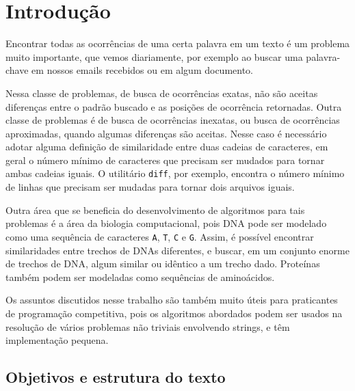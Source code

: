 \documentclass[11pt,oneside,a4paper, openany]{book}
\renewcommand{\chaptermark}[1]{\markboth{\MakeUppercase{#1}}{}}
\begin{document}
\mainmatter


\onehalfspacing            %

\setcounter{secnumdepth}{0}


\chapter*{Introdução}
\chaptermark{Introdução}


Encontrar todas as ocorrências de uma certa palavra em um texto é um problema muito importante, que vemos diariamente, por exemplo ao buscar uma palavra-chave em nossos emails recebidos ou em algum documento.

Nessa classe de problemas, de busca de ocorrências exatas, não são aceitas diferenças entre o padrão buscado e as posições de ocorrência retornadas. Outra classe de problemas é de busca de ocorrências inexatas, ou busca de ocorrências aproximadas, quando algumas diferenças são aceitas. Nesse caso é necessário adotar alguma definição de similaridade entre duas cadeias de caracteres, em geral o número mínimo de caracteres que precisam ser mudados para tornar ambas cadeias iguais. O utilitário \texttt{diff}, por exemplo, encontra o número mínimo de linhas que precisam ser mudadas para tornar dois arquivos iguais.

Outra área que se beneficia do desenvolvimento de algoritmos para tais problemas é a área da biologia computacional, pois DNA pode ser modelado como uma sequência de caracteres \texttt{A}, \texttt{T}, \texttt{C} e \texttt{G}. Assim, é possível encontrar similaridades entre trechos de DNAs diferentes, e buscar, em um conjunto enorme de trechos de DNA, algum similar ou idêntico a um trecho dado. Proteínas também podem ser modeladas como sequências de aminoácidos.

Os assuntos discutidos nesse trabalho são também muito úteis para praticantes de programação competitiva, pois os algoritmos abordados podem ser usados na resolução de vários problemas não triviais envolvendo strings, e têm implementação pequena.

\section{Objetivos e estrutura do texto}
\end{document}
